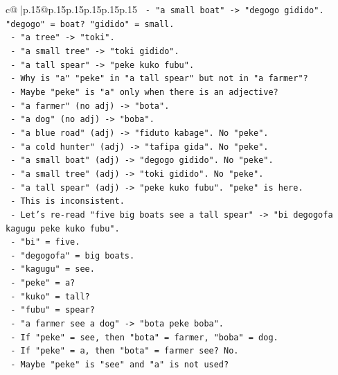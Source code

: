 \documentclass{article}
\begin{document}
{\begin{supertabular}{c@{$\;$}|p{.15\linewidth}@{}p{.15\linewidth}p{.15\linewidth}p{.15\linewidth}p{.15\linewidth}p{.15\linewidth}}
{{{\texttt{        {-} "a small boat" {-}> "degogo gidido". "degogo" = boat? "gidido" = small.} \\
\texttt{        {-} "a tree" {-}> "toki".} \\
\texttt{        {-} "a small tree" {-}> "toki gidido".} \\
\texttt{        {-} "a tall spear" {-}> "peke kuko fubu".} \\
\texttt{        {-} Why is "a" "peke" in "a tall spear" but not in "a farmer"?} \\
\texttt{        {-} Maybe "peke" is "a" only when there is an adjective?} \\
\texttt{        {-} "a farmer" (no adj) {-}> "bota".} \\
\texttt{        {-} "a dog" (no adj) {-}> "boba".} \\
\texttt{        {-} "a blue road" (adj) {-}> "fiduto kabage". No "peke".} \\
\texttt{        {-} "a cold hunter" (adj) {-}> "tafipa gida". No "peke".} \\
\texttt{        {-} "a small boat" (adj) {-}> "degogo gidido". No "peke".} \\
\texttt{        {-} "a small tree" (adj) {-}> "toki gidido". No "peke".} \\
\texttt{        {-} "a tall spear" (adj) {-}> "peke kuko fubu". "peke" is here.} \\
\texttt{        {-} This is inconsistent.} \\
\texttt{        {-} Let's re{-}read "five big boats see a tall spear" {-}> "bi degogofa kagugu peke kuko fubu".} \\
\texttt{        {-} "bi" = five.} \\
\texttt{        {-} "degogofa" = big boats.} \\
\texttt{        {-} "kagugu" = see.} \\
\texttt{        {-} "peke" = a?} \\
\texttt{        {-} "kuko" = tall?} \\
\texttt{        {-} "fubu" = spear?} \\
\texttt{        {-} "a farmer see a dog" {-}> "bota peke boba".} \\
\texttt{        {-} If "peke" = see, then "bota" = farmer, "boba" = dog.} \\
\texttt{        {-} If "peke" = a, then "bota" = farmer see? No.} \\
\texttt{        {-} Maybe "peke" is "see" and "a" is not used?} \\
}}}
\end{supertabular}}
\end{document}
